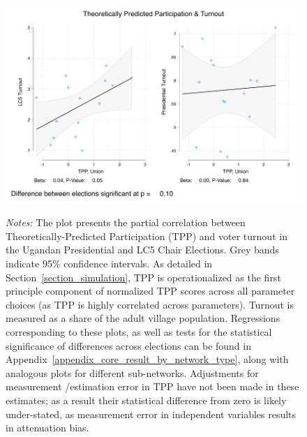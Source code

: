 \documentclass[12pt]{article}
\begin{document}
\vspace*{-0.1cm}
\begin{figure}
	\begin{center}
	    \caption{}\label{figure_social_context_scatter}
    		\includegraphics[width=\textwidth]{../3_results/context_voting_scatter.pdf}
    \end{center}
	\scriptsize{\emph{Notes:}  The plot presents the partial correlation between Theoretically-Predicted Participation (TPP) and voter turnout in the Ugandan Presidential and LC5 Chair Elections.  Grey bands indicate 95\% confidence intervals.  As detailed in Section~\ref{section_simulation}, TPP is operationalized as the first principle component of normalized TPP scores across all parameter choices (as TPP is highly correlated across parameters). Turnout is measured as a share of the adult village population. Regressions corresponding to these plots, as well as tests for the statistical significance of differences across elections can be found in Appendix~\ref{appendix_core_result_by_network_type}, along with analogous plots for different sub-networks. Adjustments for measurement /estimation error in TPP have not been made in these estimates; as a result their statistical difference from zero is likely under-stated, as measurement error in independent variables results in attenuation bias.}
\end{figure}
\end{document}
